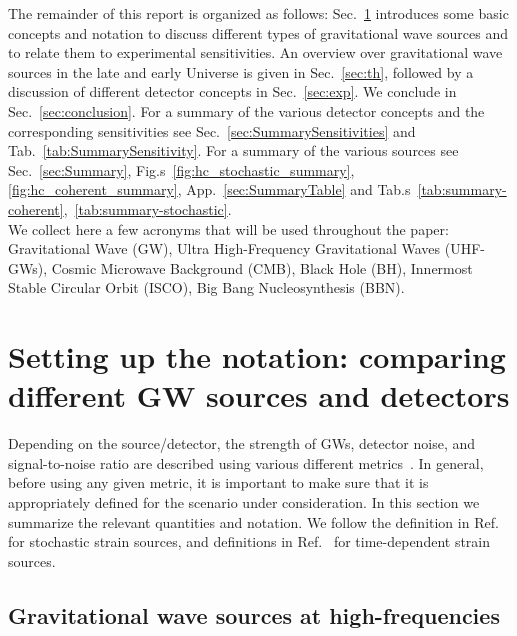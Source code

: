 \documentclass[11pt,a4paper]{article}
\begin{document}
The remainder of this report is organized as follows: Sec.~\ref{sec:Notation} introduces some basic concepts and notation to discuss different types of gravitational wave sources and to relate them to experimental sensitivities. An overview over gravitational wave sources in the late and early Universe is given in Sec.~\ref{sec:th}, followed by a discussion of different detector concepts in Sec.~\ref{sec:exp}. We conclude in Sec.~\ref{sec:conclusion}. For a summary of the various detector concepts and the corresponding sensitivities see Sec.~\ref{sec:SummarySensitivities} and Tab.~\ref{tab:SummarySensitivity}. For a summary of the various sources see Sec.~\ref{sec:Summary}, Fig.s~\ref{fig:hc_stochastic_summary}, \ref{fig:hc_coherent_summary}, App.~\ref{sec:SummaryTable} and Tab.s~\ref{tab:summary-coherent},~\ref{tab:summary-stochastic}.\\

We collect here a few acronyms that will be used throughout the paper: Gravitational Wave (GW), Ultra High-Frequency Gravitational Waves (UHF-GWs), Cosmic Microwave Background (CMB), Black Hole (BH), Innermost Stable Circular Orbit (ISCO), Big Bang Nucleosynthesis (BBN).

\section{Setting up the notation: comparing different GW sources and detectors}
\label{sec:Notation}

Depending on the source/detector, the strength of GWs, detector noise, and signal-to-noise ratio are described using various different metrics~\cite{Maggiore:1900zz}. In general, before using any given metric, it is important to make sure that it is appropriately defined for the scenario under consideration.
In this section we summarize the relevant quantities and notation. We follow the definition in Ref.~\cite{Allen:1999stochastic} for stochastic strain sources, and definitions in Ref.~\cite{Moore:2014sen} for time-dependent strain sources.

\subsection{Gravitational wave sources at high-frequencies}
\end{document}
